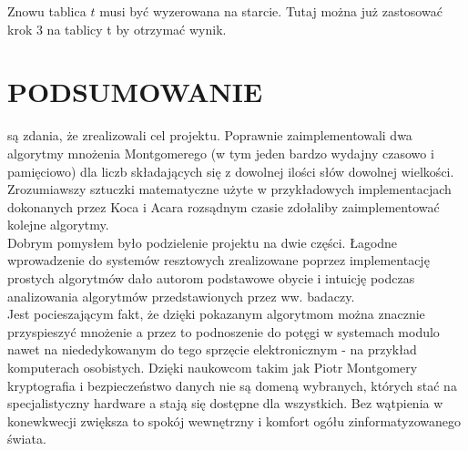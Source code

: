 \documentclass[10pt,journal,compsoc]{IEEEtran}
\begin{document}
\noindent Znowu tablica $t$ musi być wyzerowana na starcie. Tutaj można już zastosować krok 3 na tablicy t by otrzymać wynik.

\section{PODSUMOWANIE}
 są zdania, że zrealizowali cel projektu. Poprawnie zaimplementowali dwa algorytmy mnożenia Montgomerego (w tym jeden bardzo wydajny czasowo i pamięciowo) dla liczb składających się z dowolnej ilości słów dowolnej wielkości. Zrozumiawszy sztuczki matematyczne użyte w przykładowych implementacjach dokonanych przez Koca i Acara rozsądnym czasie zdołaliby zaimplementować kolejne algorytmy.  \\
Dobrym pomysłem było podzielenie projektu na dwie części. Łagodne wprowadzenie do systemów resztowych zrealizowane poprzez implementację prostych algorytmów dało autorom podstawowe obycie i intuicję podczas analizowania algorytmów przedstawionych przez ww. badaczy. \\
Jest pocieszającym fakt, że dzięki pokazanym algorytmom można znacznie przyspieszyć mnożenie a przez to podnoszenie do potęgi w systemach modulo nawet na niededykowanym do tego sprzęcie elektronicznym - na przykład komputerach osobistych. Dzięki naukowcom takim jak Piotr Montgomery kryptografia i bezpieczeństwo danych nie są domeną wybranych, których stać na specjalistyczny hardware a stają się dostępne dla wszystkich. Bez wątpienia w konewkwecji zwiększa to spokój wewnętrzny i komfort ogółu zinformatyzowanego świata.

\appendices
\end{document}
